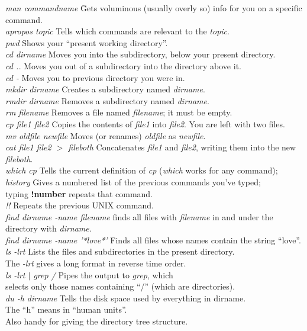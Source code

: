 \documentclass[psfig,preprint]{aastex}
\begin{document}
\begin{tabbing}
\textit{man commandname} \hspace{0.7in} \= Gets voluminous (usually overly so) info for you on a specific command. \\
\textit{apropos topic} \> Tells which commands are
relevant to the {\it topic}. \\
\textit{pwd} \> Shows your ``present working directory''. \\
\textit{cd dirname} \> Moves you into the subdirectory, below your 
present directory. \\
\textit{cd ..} \> Moves you out of a subdirectory into the directory above
it. \\
\textit{cd -} \> Moves you to previous directory you were in. \\
\textit{mkdir dirname} \> Creates a subdirectory named \textit{dirname}. \\
\textit{rmdir dirname} \> Removes a subdirectory named \textit{dirname}. \\
\textit{rm filename} \> Removes a file named \textit{filename}; it must
be empty. \\ 
\textit{cp file1 file2} \> Copies the contents of \textit{file1} into 
\textit{file2}. You are left with two files. \\
\textit{mv oldfile newfile} \> Moves (or renames) \textit{oldfile} as 
\textit{newfile}. \\
\textit{cat file1 file2 $>$ fileboth} \> Concatenates {\it file1} and {\it
file2}, writing them into the new {\it fileboth}. \\
\textit{which cp} \> Tells the current definition of {\it cp} ({\it which}
works for any command); \\
\textit{history} \> Gives a numbered list of the previous commands you've
typed; \\
\> typing {\bf !number} repeats that command. \\
\textit{!!} \> Repeats the previous UNIX command. \\
\textit{find dirname -name filename} \> finds all files with {\it
filename} in and under the directory with {\it dirname}. \\
\textit{find dirname -name '*love*'} \> Finds all files whose names 
contain the string ``love''. \\
\textit{ls -lrt} \> Lists the files and subdirectories 
in the present directory. \\
\>The {\it -lrt} gives a long format in reverse time order.\\
\textit{ls -lrt $|$ grep /} \> Pipes the output to {\it grep}, which \\
\> selects only those names containing ``/'' (which are directories). \\
\textit{du -h dirname} \> Tells the disk space used by everything in dirname. \\
\>The ``h'' means in ``human units''. \\ 
\>Also handy for giving the directory tree structure. \\


\end{tabbing}
\end{document}
